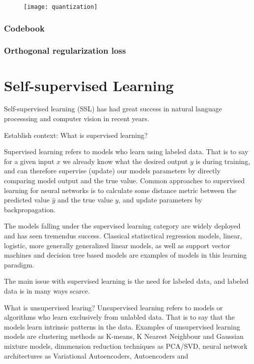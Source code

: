 \documentclass[../../thesis.tex]{subfiles}
\begin{document}
\begin{figure}[h]
    \texttt{[image: quantization]}
    \centering    
\end{figure}

\subsubsection{Codebook}

\subsubsection{Orthogonal regularization loss}

\cite{shin2023exploration} 





\section{Self-supervised Learning}
Self-supervised learning (SSL) has had great success in natural language processsing and computer vision in recent years. 

Establish context:
What is supervised learning? 

Supervised learning refers to models who learn using labeled data. That is to say for a given input $x$ we already know what the desired output $y$ is during training, and can therefore supervise (update) our models parameters by directly comparing model output and the true value. Common approaches to supervised learning for neural networks is to calculate some distance metric between the predicted value $\hat{y}$ and the true value $y$, and update parameters by backpropagation.

The models falling under the supervised learning category are widely deployed and has seen tremendus success. Classical statisctical regression models, linear, logistic, more generally generalized linear models, as well as support vector machines and decision tree based models are examples of models in this learning paradigm. 

The main issue with supervised learning is the need for labeled data, and labeled data is in many ways scarce.  


What is unsupervised learing?
Unsupervised learning refers to models or algorithms who learn exclusively from unlabled data. That is to say that the models learn intrinsic patterns in the data. Examples of unsupervised learning models are clustering methods as K-means, K Nearest Neighbour and Gaussian mixture models, dimmension reduction techniques as PCA/SVD, neural network architectures as Variational Autoencoders, Autoencoders and 
\end{document}
